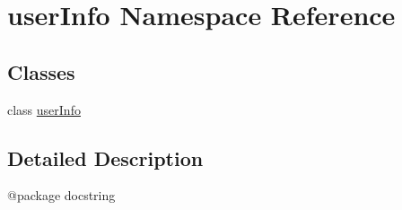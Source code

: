 \hypertarget{namespaceuserInfo}{\section{user\-Info Namespace Reference}
\label{namespaceuserInfo}
}
\subsection*{Classes}
\begin{DoxyCompactItemize}
\item 
class \hyperlink{classuserInfo_1_1userInfo}{user\-Info}
\end{DoxyCompactItemize}


\subsection{Detailed Description}
\begin{DoxyVerb}@package docstring\end{DoxyVerb}
 